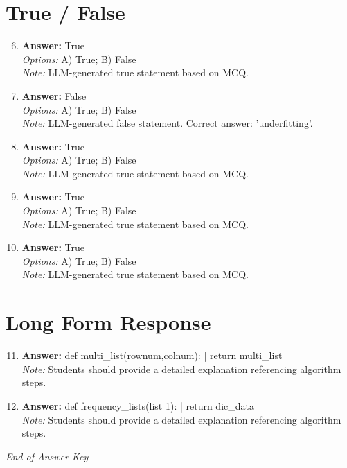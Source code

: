 \documentclass[12pt]{article}
\begin{document}
\section*{True / False}
\begin{enumerate}[label=\arabic*.]
\setcounter{enumi}{5}
\item \textbf{Answer:} True
\\ \textit{Options:} A) True; B) False
\\ \textit{Note:} LLM-generated true statement based on MCQ.
\item \textbf{Answer:} False
\\ \textit{Options:} A) True; B) False
\\ \textit{Note:} LLM-generated false statement. Correct answer: 'underfitting'.
\item \textbf{Answer:} True
\\ \textit{Options:} A) True; B) False
\\ \textit{Note:} LLM-generated true statement based on MCQ.
\item \textbf{Answer:} True
\\ \textit{Options:} A) True; B) False
\\ \textit{Note:} LLM-generated true statement based on MCQ.
\item \textbf{Answer:} True
\\ \textit{Options:} A) True; B) False
\\ \textit{Note:} LLM-generated true statement based on MCQ.
\end{enumerate}

\section*{Long Form Response}
\begin{enumerate}[label=\arabic*.]
\setcounter{enumi}{10}
\item \textbf{Answer:} def multi\_list(rownum,colnum): | return multi\_list
\\ \textit{Note:} Students should provide a detailed explanation referencing algorithm steps.
\item \textbf{Answer:} def frequency\_lists(list 1): | return dic\_data
\\ \textit{Note:} Students should provide a detailed explanation referencing algorithm steps.
\end{enumerate}

\vfill
\noindent\textit{End of Answer Key}
\end{document}
